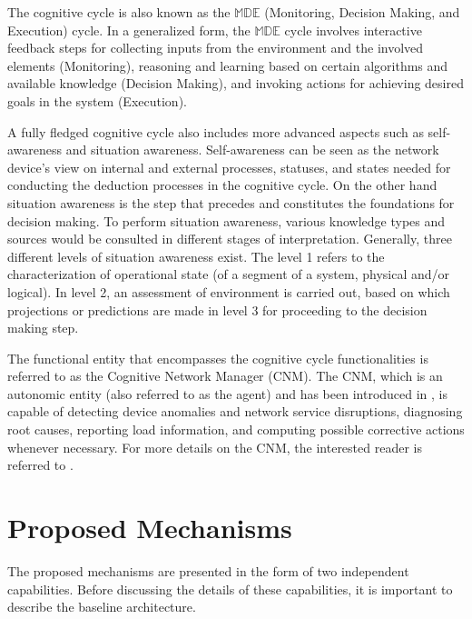 \documentclass[journal]{IEEEtran}
\begin{document}
The cognitive cycle is also known as the $\mathbb{MDE}$ (Monitoring, Decision Making, and Execution) cycle. In a generalized form, the $\mathbb{MDE}$ cycle involves interactive feedback steps for collecting inputs from the environment and the involved elements (Monitoring), reasoning and learning based on certain algorithms and available knowledge (Decision Making), and invoking actions for achieving desired goals in the system (Execution).

A fully fledged cognitive cycle also includes more advanced aspects such as self-awareness and situation awareness. Self-awareness can be seen as the network device's view on internal and external processes, statuses, and states needed for conducting the deduction processes in the cognitive cycle. On the other hand situation awareness is the step that precedes and constitutes the foundations for decision making. To perform situation awareness, various knowledge types and sources would be consulted in different stages of interpretation. Generally, three different levels of situation awareness exist. The level 1 refers to the characterization of operational state (of a segment of a system, physical and/or logical). In level 2, an assessment of environment is carried out, based on which projections or predictions are made in level 3 for proceeding to the decision making step. 


The functional entity that encompasses the cognitive cycle functionalities is referred to as the Cognitive Network Manager (CNM). The CNM, which is an autonomic entity (also referred to as the agent) and has been introduced in \cite{cognition,agent}, is capable of detecting device anomalies and network service disruptions, diagnosing root causes, reporting load information, and computing possible corrective actions whenever necessary. For more details on the CNM, the interested reader is referred to \cite{cognition}.













\section{Proposed Mechanisms}
The proposed mechanisms are presented in the form of two independent capabilities. Before discussing the details of these capabilities, it is important to describe the baseline architecture.
\end{document}
